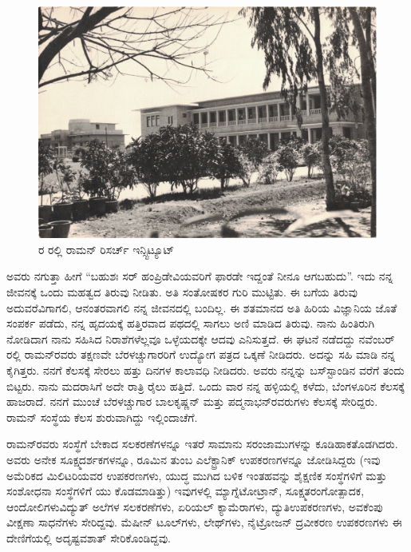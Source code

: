 \begin{figure}
\centering
\includegraphics{"images/7.jpg"}
\caption{ರ ರಲ್ಲಿ ರಾಮನ್ ರಿಸರ್ಚ್ ಇನ್ಸ್ಟಿಟ್ಯೂಟ್}\label{chap2-fig01}
\end{figure}

ಅವರು ನಗುತ್ತಾ ಹೀಗೆ\enginline{-} “ಬಹುಶಃ ಸರ್ ಹಂಪ್ರಿಡೇವಿಯವರಿಗೆ ಫಾರಡೇ ಇದ್ದಂತೆ ನೀನೂ ಆಗಬಹುದು”. ಇದು ನನ್ನ ಜೀವನಕ್ಕೆ ಒಂದು ಮಹತ್ವದ ತಿರುವು ನೀಡಿತು. ಅತಿ ಸಂತೋಷಕರ ಗುರಿ ಮುಟ್ಟಿತು. ಈ ಬಗೆಯ ತಿರುವು ಅದುವರೆವಿಗಾಗಲಿ, ಆನಂತರವಾಗಲಿ ನನ್ನ ಜೀವನದಲ್ಲಿ ಬಂದಿಲ್ಲ. ಈ ಶತಮಾನದ ಅತಿ ಹಿರಿಯ ವಿಜ್ಞಾನಿಯ ಜೊತೆ ಸಂಪರ್ಕ ಪಡೆದು, ನನ್ನ ಹೃದಯಕ್ಕೆ ಹತ್ತಿರವಾದ ಪಥದಲ್ಲಿ ಸಾಗಲು ಅಣಿ ಮಾಡಿದ ತಿರುವು. ನಾನು ಹಿಂತಿರುಗಿ ನೋಡಿದಾಗ ನಾನು ಸಹಿಸಿದ ನಿರಾಶೆಗಳೆಲ್ಲವೂ ಒಳ್ಳೆಯದಕ್ಕೇ ಆದವು ಎನಿಸುತ್ತದೆ. ಈ ಘಟನೆ ನಡೆದದ್ದು ನವೆಂಬರ್ ರಲ್ಲಿ ರಾಮನ್‍ರವರು ತಕ್ಷಣವೇ ಬೆರಳಚ್ಚುಗಾರರಿಗೆ ಉದ್ಯೋಗ ಪತ್ರದ ಒಕ್ಕಣೆ ನೀಡಿದರು. ಅದನ್ನು ಸಹಿ ಮಾಡಿ ನನ್ನ ಕೈಗಿತ್ತರು. ನನಗೆ ಕೆಲಸಕ್ಕೆ ಸೇರಲು ಹತ್ತು ದಿನಗಳ ಕಾಲಾವಧಿ ನೀಡಿದರು. ಅವರು ನನ್ನನ್ನು ಬಸ್‍ಸ್ಟಾಂಡಿನ ವರೆಗೆ ತಂದು ಬಿಟ್ಟರು. ನಾನು ಮದರಾಸಿಗೆ ಅದೇ ರಾತ್ರಿ ರೈಲು ಹತ್ತಿದೆ. ಒಂದು ವಾರ ನನ್ನ ಹಳ್ಳಿಯಲ್ಲಿ ಕಳೆದು, ಬೆಂಗಳೂರಿನ ಕೆಲಸಕ್ಕೆ ಹಾಜರಾದೆ. ನನಗೆ ಮುಂಚೆ ಬೆರಳಚ್ಚುಗಾರ ಬಾಲಕೃಷ್ಣನ್ ಮತ್ತು ಪದ್ಮನಾಭನ್‍ರವರುಗಳು ಕೆಲಸಕ್ಕೆ ಸೇರಿದ್ದರು. ರಾಮನ್ ಸಂಸ್ಥೆಯ ಕೆಲಸ ಶುರುವಾಗಿದ್ದು ಇಲ್ಲಿಂದಾಚೆಗೆ.

ರಾಮನ್‍ರವರು ಸಂಸ್ಥೆಗೆ ಬೇಕಾದ ಸಲಕರಣೆಗಳನ್ನೂ ಇತರೆ ಸಾಮಾನು ಸರಂಜಾಮುಗಳನ್ನು ಕೂಡಿಹಾಕತೊಡಗಿದರು. ಅವರು ಅನೇಕ ಸೂಕ್ಷ್ಮದರ್ಶಕಗಳನ್ನೂ, ರೂಮಿನ ತುಂಬ ಎಲೆಕ್ಟ್ರಾನಿಕ್ ಉಪಕರಣಗಳನ್ನೂ ಜೋಡಿಸಿದ್ದರು (ಇವು ಅಮೆರಿಕದ ಮಿಲಿಟರಿಯವರ ಉಪಕರಣಗಳು, ಯುದ್ಧ ಮುಗಿದ ಬಳಿಕ ಇಂತಹವನ್ನು ಶೈಕ್ಷಣಿಕ ಸಂಸ್ಥೆಗಳಿಗೆ ಮತ್ತು ಸಂಶೋಧನಾ ಸಂಸ್ಥೆಗಳಿಗೆ ಯು ಕೊಡಮಾಡಿತ್ತು) ಇವುಗಳಲ್ಲಿ ಮ್ಯಾಗ್ನೆಟೋಟ್ರಾನ್, ಸೂಕ್ಷ್ಮತರಂಗೋತ್ಪಾದಕ, ಆಂದೋಲಿಗಳು\break ವಿದ್ಯುತ್ ಅಲೆಗಳ ಸಲಕರಣೆಗಳು, ಏರಿಯಲ್ ಕ್ಯಾಮೆರಾಗಳು, ದ್ಯುತಿಉಪಕರಣಗಳು, ಅವಕೆಂಪು ವೀಕ್ಷಣಾ ಸಾಧನೆಗಳು ಸೇರಿದ್ದವು. ಮೆಷೀನ್ ಟೂಲ್‍ಗಳು, ಲೇಥ್‍ಗಳು, ನೈಟ್ರೋಜನ್ ದ್ರವೀಕರಣ ಉಪಕರಣಗಳು ಈ ದೇಣಿಗೆಯಲ್ಲಿ ಅದೃಷ್ಟವಶಾತ್ ಸೇರಿಕೊಂಡಿದ್ದವು.

